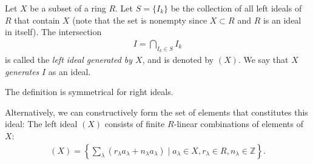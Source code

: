 \documentclass[12pt]{article}
\newcommand{\mb}{\mathbb}
\newcommand{\Z}{\mb{Z}}
\newcommand{\<}{\langle}
\renewcommand{\>}{\rangle}
\begin{document}
Let $X$ be a subset of a ring $R$.  Let $S=\{I_k\}$ be the collection of all left ideals of $R$ that contain $X$ (note that the set is nonempty since $X\subset R$ and $R$ is an ideal in itself).  The intersection
\begin{align*}
I=\bigcap_{I_k\in S} I_k
\end{align*}
is called the \emph{left ideal generated by $X$}, and is denoted by $(X)$.  We say that $X$ \emph{generates} $I$ as an ideal.

The definition is symmetrical for right ideals.

Alternatively, we can constructively form the set of elements that constitutes this ideal:  The left ideal $(X)$ consists of finite $R$-linear combinations of elements of $X$:
\begin{align*}
(X)=\left\{\sum_\lambda (r_\lambda a_\lambda + n_\lambda a_\lambda)\mid a_\lambda\in X, r_\lambda\in R, n_\lambda\in\Z\right\}.
\end{align*}
\end{document}
